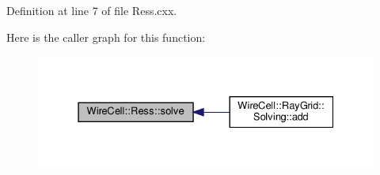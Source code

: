 Definition at line 7 of file Ress.\+cxx.

Here is the caller graph for this function\+:
\nopagebreak
\begin{figure}[H]
\begin{center}
\leavevmode
\includegraphics[width=331pt]{namespace_wire_cell_1_1_ress_adfe5a11064a23319b6204e6af6a72cfd_icgraph}
\end{center}
\end{figure}

